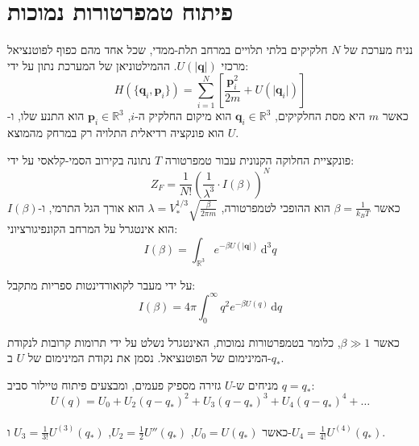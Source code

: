 \documentclass{tstextbook}
\begin{document}
\section{פיתוח טמפרטורות נמוכות}

\begin{definition}
נניח מערכת של \(N\) חלקיקים בלתי תלויים במרחב תלת-ממדי, שכל אחד מהם כפוף לפוטנציאל מרכזי \(U(\lvert \mathbf{q} \rvert)\). ההמילטוניאן של המערכת נתון על ידי:\\
$$H(\{\mathbf{q}_i, \mathbf{p}_i\}) = \sum_{i=1}^{N} \left[ \frac{\mathbf{p}_i^2}{2m} + U(\lvert \mathbf{q}_i \rvert) \right]
$$
כאשר \(m\) היא מסת החלקיקים, \(\mathbf{q}_i \in \mathbb{R}^3\) הוא מיקום החלקיק ה-\(i\), \(\mathbf{p}_i \in \mathbb{R}^3\) הוא התנע שלו, ו-\(U\) הוא פונקציה רדיאלית התלויה רק במרחק מהמוצא.

\end{definition}
\begin{definition}
פונקציית החלוקה הקנונית עבור טמפרטורה \(T\) נתונה בקירוב הסמי-קלאסי על ידי:\\
$$Z_{F} = \frac{1}{N!} \left( \frac{1}{\lambda^3} \cdot I(\beta) \right)^N
$$
כאשר \(\beta = \frac{1}{k_B T}\) הוא ההופכי לטמפרטורה, \(\lambda = V_{*}^{1/3} \sqrt{ \frac{\beta}{2\pi m} }\) הוא אורך הגל התרמי, ו-\(I(\beta)\) הוא אינטגרל על המרחב הקונפיגורציוני:\\
$$I(\beta) = \int_{\mathbb{R}^3} e^{ -\beta U(\lvert \mathbf{q} \rvert) } \, \mathrm{d}^3 q
$$

\end{definition}
\begin{lemma}
על ידי מעבר לקואורדינטות ספריות מתקבל:\\
$$I(\beta) = 4\pi \int_0^\infty q^2 e^{ -\beta U(q) } \, \mathrm{d}q
$$

\end{lemma}
\begin{remark}
כאשר \(\beta \gg 1\), כלומר בטמפרטורות נמוכות, האינטגרל נשלט על ידי תרומות קרובות לנקודת המינימום של הפוטנציאל. נסמן את נקודת המינימום של \(U\) ב-\(q_*\).

\end{remark}
\begin{definition}
מניחים ש-\(U\) גזירה מספיק פעמים, ומבצעים פיתוח טיילור סביב \(q = q_*\):\\
$$U(q) = U_0 + U_2 (q - q_*)^2 + U_3 (q - q_*)^3 + U_4 (q - q_*)^4 + \dots
$$\\

כאשר \(U_0 = U(q_*)\), \(U_2 = \frac{1}{2} U''(q_*)\), \(U_3 = \frac{1}{3!} U^{(3)}(q_*)\) ו-\(U_4 = \frac{1}{4!} U^{(4)}(q_*)\).

\end{definition}
\end{document}
